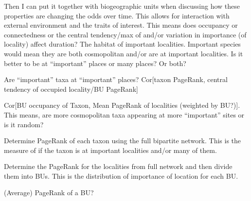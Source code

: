 \documentclass[12pt,letterpaper]{article}
\begin{document}
Then I can put it together with biogeographic units when discussing how these properties are changing the odds over time. This allows for interaction with external environment and the traits of interest. This means does occupancy or connectedness or the central tendency/max of and/or variation in importance (of locality) affect duration? The habitat of important localities. Important species would mean they are both cosmopolitan and/or are at important localities. Is it better to be at ``important'' places or many places? Or both?


Are ``important'' taxa at ``important'' places? Cor[taxon PageRank, central tendency of occupied locality/BU PageRank]

Cor[BU occupancy of Taxon, Mean PageRank of localities (weighted by BU?)]. This means, are more cosmopolitan taxa appearing at more ``important'' sites or is it random?

Determine PageRank of each taxon using the full bipartite network. This is the measure of if the taxon is at important localities and/or many of them. 

Determine the PageRank for the localities from full network and then divide them into BUs. This is the distribution of importance of location for each BU.

(Average) PageRank of a BU?
\end{document}
